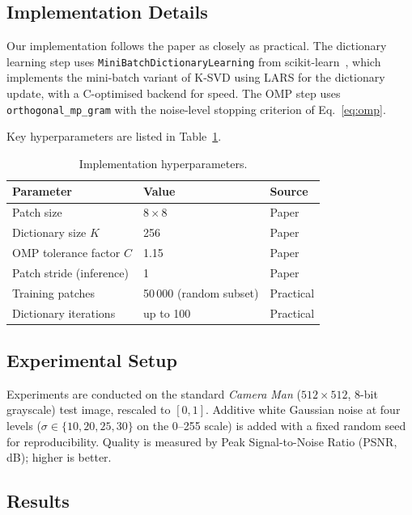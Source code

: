 \subsection{Implementation Details}

Our implementation follows the paper as closely as practical.
The dictionary learning step uses \texttt{MiniBatchDictionaryLearning}
from scikit-learn~\cite{scikit-learn}, which implements the
mini-batch variant of K-SVD using LARS for the dictionary update,
with a C-optimised backend for speed.
The OMP step uses \texttt{orthogonal\_mp\_gram} with the
noise-level stopping criterion of Eq.~\eqref{eq:omp}.

Key hyperparameters are listed in Table~\ref{tab:params}.

\begin{table}[h]
\centering
\caption{Implementation hyperparameters.}
\label{tab:params}
\begin{tabular}{@{}lll@{}}
\toprule
Parameter & Value & Source \\
\midrule
Patch size                  & $8 \times 8$   & Paper \\
Dictionary size $K$         & 256            & Paper \\
OMP tolerance factor $C$    & 1.15           & Paper \\
Patch stride (inference)    & 1              & Paper \\
Training patches            & 50\,000 (random subset) & Practical \\
Dictionary iterations       & up to 100      & Practical \\
\bottomrule
\end{tabular}
\end{table}

\subsection{Experimental Setup}

Experiments are conducted on the standard \emph{Camera Man}
($512 \times 512$, 8-bit grayscale) test image, rescaled to
$[0, 1]$.  Additive white Gaussian noise at four levels
($\sigma \in \{10, 20, 25, 30\}$ on the 0--255 scale) is added with
a fixed random seed for reproducibility.  Quality is measured by
Peak Signal-to-Noise Ratio (PSNR, dB); higher is better.

\subsection{Results}

